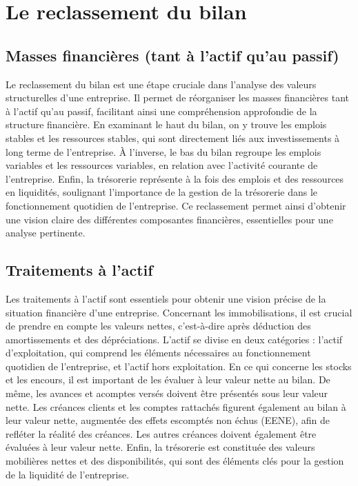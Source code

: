 \documentclass[a4paper, 12pt]{report}
\begin{document}
\section{Le reclassement du bilan}

\subsection{Masses financières (tant à l'actif qu'au passif)}

Le reclassement du bilan est une étape cruciale dans l'analyse des valeurs structurelles d'une entreprise. Il permet de réorganiser les masses financières tant à l'actif qu'au passif, facilitant ainsi une compréhension approfondie de la structure financière. En examinant le haut du bilan, on y trouve les emplois stables et les ressources stables, qui sont directement liés aux investissements à long terme de l'entreprise. À l'inverse, le bas du bilan regroupe les emplois variables et les ressources variables, en relation avec l'activité courante de l'entreprise. Enfin, la trésorerie représente à la fois des emplois et des ressources en liquidités, soulignant l'importance de la gestion de la trésorerie dans le fonctionnement quotidien de l'entreprise. Ce reclassement permet ainsi d'obtenir une vision claire des différentes composantes financières, essentielles pour une analyse pertinente.

\subsection{Traitements à l'actif}

Les traitements à l'actif sont essentiels pour obtenir une vision précise de la situation financière d'une entreprise. Concernant les immobilisations, il est crucial de prendre en compte les valeurs nettes, c'est-à-dire après déduction des amortissements et des dépréciations. L'actif se divise en deux catégories : l'actif d'exploitation, qui comprend les éléments nécessaires au fonctionnement quotidien de l'entreprise, et l'actif hors exploitation. En ce qui concerne les stocks et les encours, il est important de les évaluer à leur valeur nette au bilan. De même, les avances et acomptes versés doivent être présentés sous leur valeur nette. Les créances clients et les comptes rattachés figurent également au bilan à leur valeur nette, augmentée des effets escomptés non échus (EENE), afin de refléter la réalité des créances. Les autres créances doivent également être évaluées à leur valeur nette. Enfin, la trésorerie est constituée des valeurs mobilières nettes et des disponibilités, qui sont des éléments clés pour la gestion de la liquidité de l'entreprise.
\end{document}
